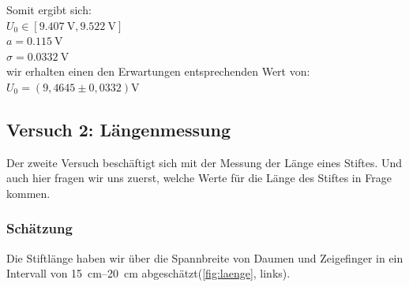 \documentclass[11pt,a4paper,titlepage, ngerman]{article}
\begin{document}
				\begin{flushleft}
					Somit ergibt sich:\\
					\vspace{0.5cm}
					$U_0 \in [\SI{9.407}{\V},\SI{9.522}{\V}]$\\
					$a = \SI{0.115}{\V}$ \\
					$\sigma = \SI{0,0332}{\V}$ \\
					\vspace{0.5cm}
					wir erhalten einen den Erwartungen entsprechenden Wert von: \\ 
					\vspace{0.5cm}
					$U_0 = (9,4645 \pm 0,0332)\si{\V}$\\ 
				\end{flushleft}
	
		\newpage
		\subsection{Versuch 2: Längenmessung}
			\label{2.2}
			
			Der zweite Versuch beschäftigt sich mit der Messung der Länge eines Stiftes. Und auch hier fragen wir uns zuerst, welche Werte für die Länge des Stiftes in Frage kommen.
		
			\subsubsection{Schätzung}
				\label{2.2.1}
				
				Die Stiftlänge haben wir über die Spannbreite von Daumen und Zeigefinger in ein Intervall von \SIrange{15}{20}{\cm} abgeschätzt(\ref{fig:laenge}, links).
				
\end{document}

